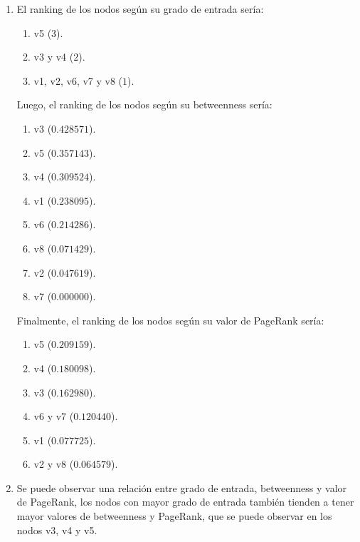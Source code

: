 \documentclass[12pt]{article}
\begin{document}
\begin{enumerate}
\begin{enumerate}
        \item El ranking de los nodos según su grado de entrada sería:
        \begin{enumerate}
            \item v5 ($3$).
            \item v3 y v4 ($2$).
            \item v1, v2, v6, v7 y v8 ($1$).
        \end{enumerate}

        Luego, el ranking de los nodos según su betweenness sería:
        \begin{enumerate}
            \item v3 ($0.428571$).
            \item v5 ($0.357143$).
            \item v4 ($0.309524$).
            \item v1 ($0.238095$).
            \item v6 ($0.214286$).
            \item v8 ($0.071429$).
            \item v2 ($0.047619$).
            \item v7 ($0.000000$).
        \end{enumerate}

        Finalmente, el ranking de los nodos según su valor de PageRank sería:
        \begin{enumerate}
            \item v5 ($0.209159$).
            \item v4 ($0.180098$).
            \item v3 ($0.162980$).
            \item v6 y v7 ($0.120440$).
            \item v1 ($0.077725$).
            \item v2 y v8 ($0.064579$).
        \end{enumerate}

        \item Se puede observar una relación entre grado de entrada, betweenness y valor de PageRank, los nodos con mayor grado de entrada también tienden a tener mayor valores de betweenness y PageRank, que se puede observar en los nodos v3, v4 y v5.
        

\end{enumerate}
\end{enumerate}
\end{document}
